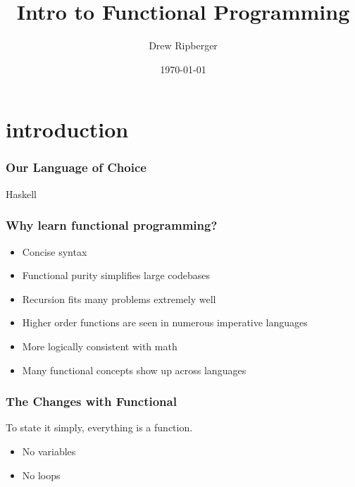 \documentclass{beamer}
\title{Intro to Functional Programming}
\author{Drew Ripberger}
\date{\today}
\begin{document}
\frame{\titlepage}

\section{introduction}

\begin{frame}
  \frametitle{Our Language of Choice}
  \begin{block}{Haskell}
  \end{block}

\end{frame}


\begin{frame}
  \frametitle{Why learn functional programming?}
  \begin{itemize}
  \item Concise syntax
  \item Functional purity simplifies large codebases
  \item Recursion fits many problems extremely well
  \item Higher order functions are seen in numerous imperative languages
  \item More logically consistent with math
  \item Many functional concepts show up across languages
  \end{itemize}
\end{frame}

\begin{frame}
  \frametitle{The Changes with Functional}
  To state it simply, everything is a function.
  \begin{itemize}
  \item No variables
  \item No loops
  \end{itemize}
\end{frame}
\end{document}

